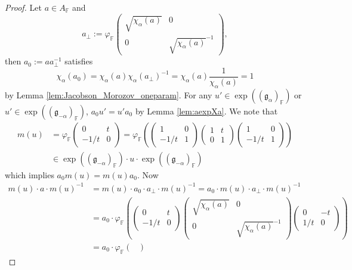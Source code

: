 \documentclass[12pt]{amsart}
\newcommand{\F}{\mathbb{F} }
\newcommand{\frakg}{\mathfrak{g}}
\numberwithin{equation}{section}
\theoremstyle{remark} %
\begin{document}
\begin{proof}
	Let $a\in A_\F$ and
	$$
	a_\perp := \varphi_\F \begin{pmatrix}
		\sqrt{\chi_\alpha(a)} & 0 \\ 0 & \sqrt{\chi_\alpha(a)}^{-1}
	\end{pmatrix},
	$$ 
	then $a_0:= aa_\perp^{-1}$ satisfies
	$$
	\chi_\alpha (a_0) = \chi_\alpha(a) \chi_\alpha(a_\perp)^{-1} = \chi_\alpha(a) \frac{1}{\chi_\alpha(a)} = 1 
	$$
	by Lemma \ref{lem:Jacobson_Morozov_oneparam}. For any $u' \in \exp((\frakg_{\alpha})_\F)$ or $u'\in \exp((\frakg_{-\alpha})_\F)$, $a_0u'=u'a_0$ by Lemma \ref{lem:aexpXa}. We note that
	\begin{align*}
			m(u) &= \varphi_\F \begin{pmatrix}
			0 & t \\ -1/t & 0
		\end{pmatrix} =  \varphi_\F \left( \begin{pmatrix}
			1 & 0 \\ -1/t & 1
		\end{pmatrix}  \begin{pmatrix}
			1 & t \\ 0 & 1
		\end{pmatrix} \begin{pmatrix}
			1 & 0 \\ -1/t & 1
		\end{pmatrix}\right) \\
		& \in \exp((\frakg_{-\alpha})_\F) \cdot u \cdot \exp((\frakg_{-\alpha})_\F)
	\end{align*}
	which implies $a_0m(u) = m(u)a_0$. Now
	\begin{align*}
		m(u) \cdot a \cdot m(u)^{-1} &= m(u) \cdot a_0 \cdot a_\perp \cdot m(u)^{-1} = a_0 \cdot m(u) \cdot  a_\perp \cdot m(u)^{-1} \\
		&= a_0 \cdot \varphi_\F \left(\begin{pmatrix}
			0 & t \\ -1/t & 0
		\end{pmatrix}\begin{pmatrix}
		\sqrt{\chi_\alpha(a)} & 0 \\ 0 & \sqrt{\chi_\alpha(a)}^{-1}
		\end{pmatrix}\begin{pmatrix}
		0 & -t \\ 1/t & 0
		\end{pmatrix}\right) \\
		&= a_0\cdot \varphi_\F \begin{pmatrix}

\end{pmatrix}
\end{align*}
\end{proof}
\end{document}
